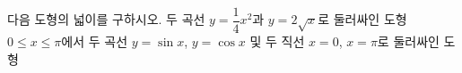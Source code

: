 다음 도형의 넓이를 구하시오.
 두 곡선 $y=\dfrac{1}{4}x^2$과 $y=2\sqrt{x}$로 둘러싸인 도형
 $0\le x\le\pi$에서 두 곡선 $y=\sin x$, $y=\cos x$ 및 두 직선 $x=0$, $x=\pi$로 둘러싸인 도형
